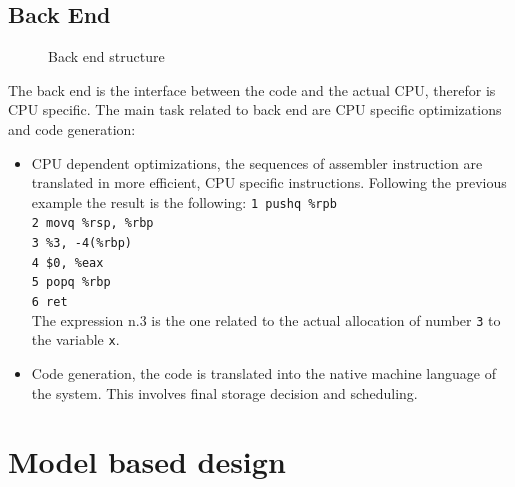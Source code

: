 \documentclass[../main.tex]{subfiles}
\begin{document}
\subsection{Back End}
\begin{figure}[h]
  \centering
{}
  \caption{Back end structure}
\end{figure}
The back end is the interface between the code and the actual CPU, therefor is CPU specific. The main task related to back end are CPU specific optimizations and code generation:
\begin{itemize}
    \item CPU dependent optimizations, the sequences of assembler instruction are translated in more efficient, CPU specific instructions. Following the previous example the result is the following:
        \texttt{1 pushq \%rpb}\\
        \texttt{2 movq \%rsp, \%rbp}\\
        \texttt{3 \%3, -4(\%rbp)}\\
        \texttt{4 \$0, \%eax}\\
        \texttt{5 popq \%rbp}\\
        \texttt{6 ret}\\
    The expression n.3 is the one related to the actual allocation of number \texttt{3} to the variable \texttt{x}.
    \item Code generation, the code is translated into the native machine language of the system. This involves final storage decision and scheduling. 
\end{itemize}
\section{Model based design}
\end{document}
